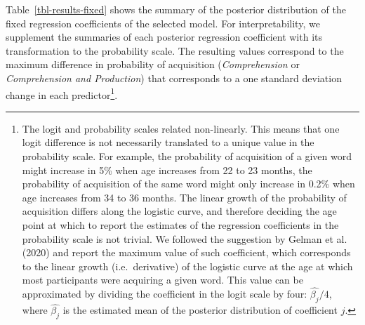 \documentclass[
  letterpaper,
  DIV=11,
  numbers=noendperiod]{scrartcl}
\begin{document}
Table~\ref{tbl-results-fixed} shows the summary of the posterior
distribution of the fixed regression coefficients of the selected model.
For interpretability, we supplement the summaries of each posterior
regression coefficient with its transformation to the probability scale.
The resulting values correspond to the maximum difference in probability
of acquisition (\emph{Comprehension} or \emph{Comprehension and
Production}) that corresponds to a one standard deviation change in each
predictor\footnote{The logit and probability scales related
  non-linearly. This means that one logit difference is not necessarily
  translated to a unique value in the probability scale. For example,
  the probability of acquisition of a given word might increase in 5\%
  when age increases from 22 to 23 months, the probability of
  acquisition of the same word might only increase in 0.2\% when age
  increases from 34 to 36 months. The linear growth of the probability
  of acquisition differs along the logistic curve, and therefore
  deciding the age point at which to report the estimates of the
  regression coefficients in the probability scale is not trivial. We
  followed the suggestion by Gelman et al. (2020) and report the maximum
  value of such coefficient, which corresponds to the linear growth
  (i.e.~derivative) of the logistic curve at the age at which most
  participants were acquiring a given word. This value can be
  approximated by dividing the coefficient in the logit scale by four:
  \(\hat{\beta_j}/4\), where \(\hat{\beta_j}\) is the estimated mean of
  the posterior distribution of coefficient \(j\).}.
\end{document}

